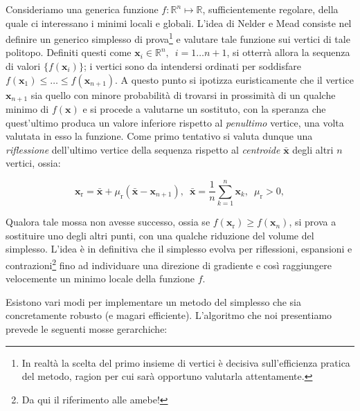 \noindent Consideriamo una generica funzione $f\!: \mathbb{R}^n \mapsto \mathbb{R}$, sufficientemente regolare, della quale ci interessano i minimi locali e globali. L'idea di Nelder e Mead consiste nel definire un generico simplesso di prova\footnote{In realtà la scelta del primo insieme di vertici è decisiva sull'efficienza pratica del metodo, ragion per cui sarà opportuno valutarla attentamente.} e valutare tale funzione sui vertici di tale politopo. Definiti questi come $\mathbf{x}_i \in \mathbb{R}^n,\enspace i = 1\dots n+1$, si otterrà allora la sequenza di valori $\{f(\mathbf{x}_i)\}$; i vertici sono da intendersi ordinati per soddisfare $f(\mathbf{x}_1) \leq \dots \leq f(\mathbf{x}_{n+1})$. A questo punto si ipotizza euristicamente che il vertice $\mathbf{x}_{n+1}$ sia quello con minore probabilità di trovarsi in prossimità di un qualche minimo di $f(\mathbf{x})$ e si procede a valutarne un sostituto, con la speranza che quest'ultimo produca un valore inferiore rispetto al \emph{penultimo} vertice, una volta valutata in esso la funzione. Come primo tentativo si valuta dunque una \emph{riflessione} dell'ultimo vertice della sequenza rispetto al \emph{centroide} $\bar{\mathbf{x}}$ degli altri $n$ vertici, ossia:

\begin{equation*}
\mathbf{x}_\mathrm{r} = \bar{\mathbf{x}} + \mu_\mathrm{r}(\bar{\mathbf{x}}-\mathbf{x}_{n+1}), \enspace \bar{\mathbf{x}} = \frac{1}{n}\sum_{k=1}^{n} \mathbf{x}_k,\enspace \mu_\mathrm{r} > 0,
\end{equation*}

\noindent Qualora tale mossa non avesse successo, ossia se $f(\mathbf{x}_\mathrm{r} )  \geq f(\mathbf{x}_{n})$, si prova a sostituire uno degli altri punti, con una qualche riduzione del volume del simplesso. L'idea è in definitiva che il simplesso evolva per riflessioni, espansioni e contrazioni\footnote{Da qui il riferimento alle amebe!} fino ad individuare una direzione di gradiente e così raggiungere velocemente un minimo locale della funzione $f$.\vfill

\noindent Esistono vari modi per implementare un metodo del simplesso che sia concretamente robusto (e magari efficiente). L'algoritmo che noi presentiamo prevede le seguenti mosse gerarchiche:

